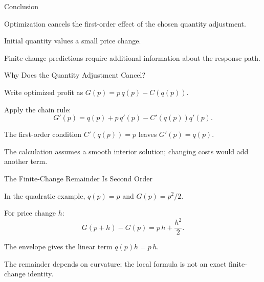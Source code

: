 \documentclass[10pt,aspectratio=169]{beamer}
\begin{document}
\begin{frame}[label=bq_main_end]{Conclusion}
\begin{BQList}
\item<1-> Optimization cancels the first-order effect of the chosen quantity adjustment.
\item<2-> Initial quantity values a small price change.
\item<3-> Finite-change predictions require additional information about the response path.
\end{BQList}
\end{frame}

\BQAppendix
{}
\begin{frame}[noframenumbering,label=backup_derivation]{Why Does the Quantity Adjustment Cancel?}
\begin{BQCompact}
\item Write optimized profit as $G(p)=p\,q(p)-C(q(p))$.
\item Apply the chain rule:
\[G'(p)=q(p)+p\,q'(p)-C'(q(p))q'(p).\]
\item The first-order condition $C'(q(p))=p$ leaves $G'(p)=q(p)$.
\item The calculation assumes a smooth interior solution; changing costs would add another term.
\end{BQCompact}
\end{frame}

\begin{frame}[noframenumbering,label=backup_finite]{The Finite-Change Remainder Is Second Order}
\begin{BQCompact}
\item In the quadratic example, $q(p)=p$ and $G(p)=p^2/2$.
\item For price change $h$:
\[G(p+h)-G(p)=p\,h+\frac{h^2}{2}.\]
\item The envelope gives the linear term $q(p)h=p\,h$.
\item The remainder depends on curvature; the local formula is not an exact finite-change identity.
\end{BQCompact}
\end{frame}
\end{document}
